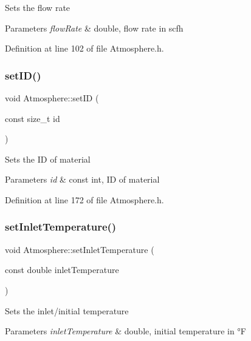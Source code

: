 Sets the flow rate 
\begin{DoxyParams}{Parameters}
{\em flow\+Rate} & double, flow rate in scfh \\
\hline
\end{DoxyParams}


Definition at line 102 of file Atmosphere.\+h.

\mbox{\label{class_atmosphere_a156e09f05336057be5591146948f6046}} 
\subsubsection{\texorpdfstring{set\+I\+D()}{setID()}}
{\footnotesize\ttfamily void Atmosphere\+::set\+ID (\begin{DoxyParamCaption}\item[{const size\+\_\+t}]{id }\end{DoxyParamCaption})\hspace{0.3cm}{\ttfamily [inline]}}

Sets the ID of material 
\begin{DoxyParams}{Parameters}
{\em id} & const int, ID of material \\
\hline
\end{DoxyParams}


Definition at line 172 of file Atmosphere.\+h.

\mbox{\label{class_atmosphere_a592bf7f82ea518fbd9da86d8f10cbc5c}} 
\subsubsection{\texorpdfstring{set\+Inlet\+Temperature()}{setInletTemperature()}}
{\footnotesize\ttfamily void Atmosphere\+::set\+Inlet\+Temperature (\begin{DoxyParamCaption}\item[{const double}]{inlet\+Temperature }\end{DoxyParamCaption})\hspace{0.3cm}{\ttfamily [inline]}}

Sets the inlet/initial temperature 
\begin{DoxyParams}{Parameters}
{\em inlet\+Temperature} & double, initial temperature in °F \\
\hline
\end{DoxyParams}


